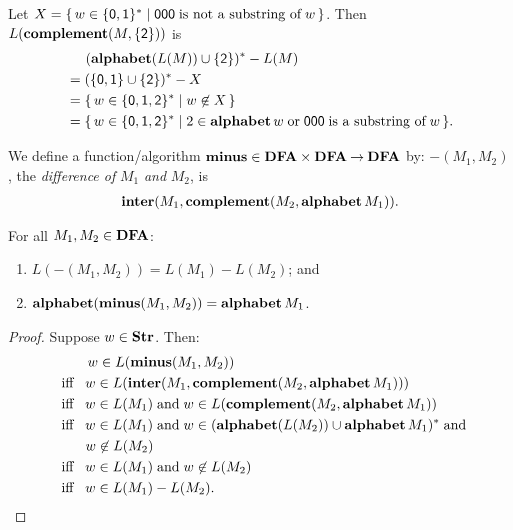 Let $X=\{ \, w\in\{\mathsf{0,1}\}^* \mid \mathsf{000}\;\allowbreak\mbox{is not a
    substring of}\allowbreak\;w \, \}$.  Then $L(\mathbf{complement}(M,\{\mathsf{2}\}))$ is
\begin{alignat*}{2}
&\mathrel{\hspace*{.3cm}} (\mathbf{alphabet}(L(M))\cup\{\mathsf{2}\})^*-L(M) \\
&=(\{\mathsf{0,1}\}\cup\{\mathsf{2}\})^* - X \\
&=\{ \, w\in\{\mathsf{0,1,2}\}^* \mid w\not\in X \, \} \\
&=\{ \, w\in\{\mathsf{0,1,2}\}^* \mid 2\in\mathbf{alphabet}\,w\;\allowbreak\mbox{or}\allowbreak\;
\mathsf{000}\;\allowbreak\mbox{is a substring of}\allowbreak\;w \, \} .
\end{alignat*}

%
%
%
%
We define a function/algorithm $\mathbf{minus}\in\mathbf{DFA}\times\mathbf{DFA}\mathbin{\to}\mathbf{DFA}$ by:
$\minus(M_1,M_2)$, the \emph{difference of} $M_1$ \emph{and} $M_2$, is
\begin{gather*}
\mathbf{inter}(M_1,\mathbf{complement}(M_2,{\mathbf{alphabet}\,M_1})) .
\end{gather*}

\begin{theorem}
\label{DFAMinusTheorem}
For all $M_1,M_2\in\mathbf{DFA}$:
\begin{enumerate}[\quad(1)]
\item $L(\minus(M_1,M_2)) = L(M_1)-L(M_2)$; and

\item $\mathbf{alphabet}(\mathbf{minus}(M_1,M_2)) = \mathbf{alphabet}\,M_1$.
\end{enumerate}
\end{theorem}

\begin{proof}
Suppose $w\in\mathbf{Str}$.  Then:
\begin{align*}
&\hspace{.95cm} w\in L(\mathbf{minus}(M_1,M_2)) \\
&\mathrel{\;\;\allowbreak\mbox{iff}\allowbreak\;\;} w\in L(\mathbf{inter}(M_1,\mathbf{complement}(M_2,\mathbf{alphabet}\,M_1))) \\
&\mathrel{\;\;\allowbreak\mbox{iff}\allowbreak\;\;} w\in L(M_1)\;\allowbreak\mbox{and}\allowbreak\;w\in L(\mathbf{complement}(M_2,\mathbf{alphabet}\,M_1)) \\
&\mathrel{\;\;\allowbreak\mbox{iff}\allowbreak\;\;} w\in L(M_1)\;\allowbreak\mbox{and}\allowbreak\;w\in(\mathbf{alphabet}(L(M_2))\cup\mathbf{alphabet}\,M_1)^*\;\allowbreak\mbox{and}\allowbreak\; \\
&\qquad\;\; w\not\in L(M_2) \\
&\mathrel{\;\;\allowbreak\mbox{iff}\allowbreak\;\;} w\in L(M_1)\;\allowbreak\mbox{and}\allowbreak\;w\not\in L(M_2) \\
&\mathrel{\;\;\allowbreak\mbox{iff}\allowbreak\;\;} w\in L(M_1)-L(M_2) .
\end{align*}
\end{proof}


